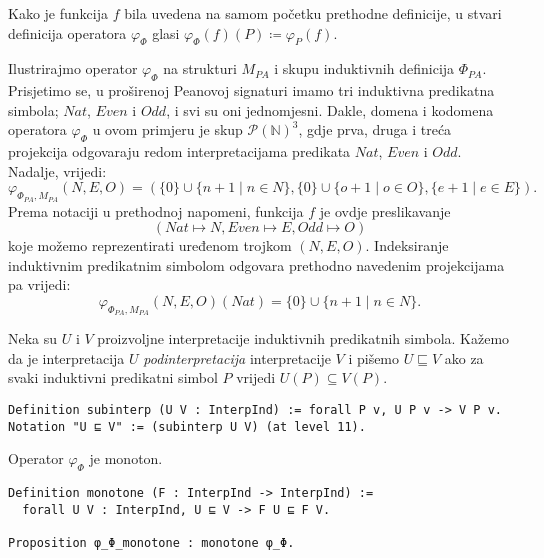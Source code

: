 \begin{remark}\label{remark:phi-phi-notation}
  Kako je funkcija \(f\) bila uvedena na samom početku prethodne definicije,
  u stvari definicija operatora \(\varphi_{\Phi}\) glasi
  \(
    \varphi_{\Phi}(f)(P) \coloneq \varphi_{P}(f)
  \).
\end{remark}

\begin{example}\label{ex:operator-phi-phi-PA}
  Ilustrirajmo operator \(\varphi_{\Phi}\) na strukturi \(M_{\mathit{PA}}\) i
  skupu induktivnih definicija \(\Phi_{\mathit{PA}}\).
  Prisjetimo se, u proširenoj Peanovoj signaturi imamo tri induktivna predikatna simbola;
  \(\mathit{Nat}\), \(\mathit{Even}\) i \(\mathit{Odd}\), i svi su oni jednomjesni.
  Dakle, domena i kodomena operatora \(\varphi_{\Phi}\) u ovom primjeru je skup \(\mathcal{P(\mathbb{N})}^{3}\),
  gdje prva, druga i treća projekcija odgovaraju redom interpretacijama predikata
  \(\mathit{Nat}\), \(\mathit{Even}\) i \(\mathit{Odd}\). Nadalje, vrijedi:
  \[
    \varphi_{\Phi_{\mathit{PA}}, M_{\mathit{PA}}}(N, E, O) =
    ( \{ 0 \} \cup \{ n + 1 \mid n \in N \},
    \{ 0 \} \cup \{ o + 1 \mid o \in O \},
    \{ e + 1 \mid e \in E \} ).
  \]
  \noindent Prema notaciji u prethodnoj napomeni,
  funkcija \(f\) je ovdje preslikavanje
  \[(\mathit{Nat} \mapsto \mathit{N}, \mathit{Even} \mapsto \mathit{E}, \mathit{Odd} \mapsto \mathit{O})\]
  koje možemo reprezentirati uređenom trojkom \((N, E, O)\).
  Indeksiranje induktivnim predikatnim simbolom odgovara prethodno
  navedenim projekcijama pa vrijedi:
  \[
    \varphi_{\Phi_{\mathit{PA}}, M_{\mathit{PA}}}(N, E, O)(\mathit{Nat}) = \{ 0 \} \cup \{ n + 1 \mid n \in N \}.
  \]
\end{example}

\begin{definition}
  Neka su \(U\) i \(V\) proizvoljne interpretacije induktivnih predikatnih simbola.
  Kažemo da je interpretacija \(U\) \textit{podinterpretacija} interpretacije \(V\)
  i pišemo \(U \sqsubseteq V\)
  ako za svaki induktivni predikatni simbol \(P\) vrijedi \(U(P) \subseteq V(P)\).
\begin{verbatim}
Definition subinterp (U V : InterpInd) := forall P v, U P v -> V P v.
Notation "U ⊑ V" := (subinterp U V) (at level 11).
\end{verbatim}
\end{definition}

\begin{proposition}
  Operator \(\varphi_{\Phi}\) je monoton.
\begin{verbatim}
Definition monotone (F : InterpInd -> InterpInd) :=
  forall U V : InterpInd, U ⊑ V -> F U ⊑ F V.

Proposition φ_Φ_monotone : monotone φ_Φ.
\end{verbatim}
\end{proposition}

